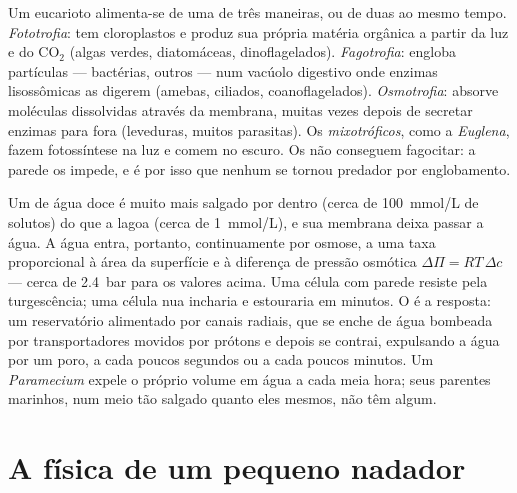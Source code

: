 \begin{definition}\label{def:b2:unicellular-diversity:nutrition}
Um eucarioto  alimenta-se de uma de três maneiras, ou de
duas ao mesmo tempo. \emph{Fototrofia}: tem cloroplastos e produz sua
própria matéria orgânica a partir da luz e do $\mathrm{CO_2}$ (algas
verdes, diatomáceas, dinoflagelados). \emph{Fagotrofia}: engloba
partículas --- bactérias, outros  --- num vacúolo digestivo
onde enzimas lisossômicas as digerem (amebas, ciliados,
coanoflagelados). \emph{Osmotrofia}: absorve moléculas dissolvidas
através da membrana, muitas vezes depois de secretar enzimas para
fora (leveduras, muitos parasitas). Os \emph{mixotróficos}, como a
\emph{Euglena}, fazem fotossíntese na luz e comem no escuro. Os
 não conseguem fagocitar: a parede os impede, e é por isso
que nenhum  se tornou predador por englobamento.
\end{definition}

\begin{proposition}\label{prop:b2:unicellular-diversity:osmoregulation}
Um  de água doce é muito mais salgado por dentro (cerca de
\qty{100}{mmol/L} de solutos) do que a lagoa (cerca de
\qty{1}{mmol/L}), e sua membrana deixa passar a água. A água entra,
portanto, continuamente por osmose, a uma taxa proporcional à área da
superfície e à diferença de pressão osmótica
$\Delta\Pi = RT\,\Delta c$ --- cerca de \qty{2.4}{bar} para os valores
acima. Uma célula com parede resiste pela turgescência; uma célula nua
incharia e estouraria em minutos. O \emph{} é a
resposta: um reservatório alimentado por canais radiais, que se enche
de água bombeada por transportadores movidos por prótons e depois se
contrai, expulsando a água por um poro, a cada poucos segundos ou a
cada poucos minutos. Um \emph{Paramecium} expele o próprio volume em
água a cada meia hora; seus parentes marinhos, num meio tão salgado
quanto eles mesmos, não têm  algum.
\end{proposition}

\section{A física de um pequeno nadador}

